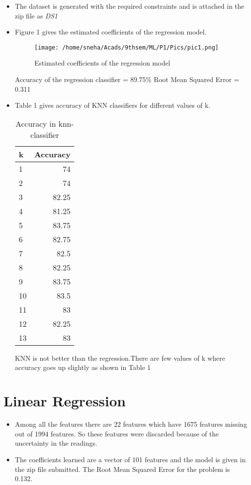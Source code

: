 \documentclass[12pt]{article}
\begin{document}
\begin{itemize}
\item{The dataset is generated with the required constraints and is attached in the zip file as \emph{DS1}}
\item{Figure 1 gives the estimated coefficients of the regression model.
\begin{figure}
	\centering
		\texttt{[image: /home/sneha/Acads/9thsem/ML/P1/Pics/pic1.png]}
	\caption{Estimated coefficients of the regression model}
	
\end{figure}}

Accuracy of the regression classifier = 89.75\%
Root Mean Squared Error = 0.311

\item{ Table 1 gives accuracy of KNN classifiers for different values of k.
\begin{table}
\centering
		\begin{tabular}{|l | r|}
			\hline
			\textbf{k} & \textbf{Accuracy} \\ \hline
			 1 & 74 \\ \hline
			2 & 74\\ \hline
			3 & 82.25  \\ \hline
			 4  & 81.25\\ \hline
			5 & 83.75 \\ \hline
			6 & 82.75 \\ \hline
			7 & 82.5 \\ \hline
			8 & 82.25 \\ \hline
			9 & 83.75 \\ \hline
			10 & 83.5 \\ \hline
			11& 83 \\ \hline
			12& 82.25 \\ \hline
			13& 83 \\ \hline
			
			
		\end{tabular}
	\caption{Accuracy in knn-classifier}

\end{table}

KNN is not better than the regression.There are few values of k where accuracy goes up slightly as shown in Table 1}

\end{itemize}

\section{Linear Regression}
\begin{itemize}
\item{ Among all the features there are 22 features which have 1675 features missing out of 1994 features. So these features were discarded because of the uncertainty in the readings.}

\item{ The coefficients learned are a vector of 101 features and the model is given in the zip file submitted. The Root Mean Squared Error for the problem is 0.132.}


\end{itemize}
\end{document}
